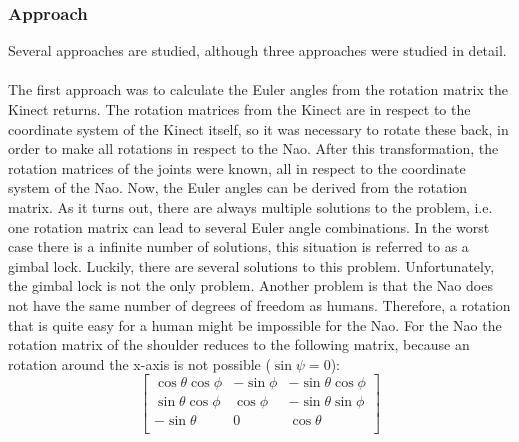 \documentclass[letterpaper, 10pt, conference]{ieeeconf}
\begin{document}
\subsubsection{Approach}
Several approaches are studied, although three approaches were studied in detail. 
\\
\\
The first approach was to calculate the Euler angles from the rotation matrix the Kinect returns. 
The rotation matrices from the Kinect are in respect to the coordinate system of the Kinect itself, so it was necessary to rotate these back, in order to make all rotations in respect to the Nao. 
After this transformation, the rotation matrices of the joints were known, all in respect to the coordinate system of the Nao. 
Now, the Euler angles can be derived from the rotation matrix.  
As it turns out, there are always multiple solutions to the problem, i.e. one rotation matrix can lead to several Euler angle combinations. 
In the worst case there is a infinite number of solutions, this situation is referred to as a gimbal lock\cite{Shoemake1985}. Luckily, there are several solutions to this problem\cite{euler}. 
Unfortunately, the gimbal lock is not the only problem.
Another problem is that the Nao does not have the same number of degrees of freedom as humans. Therefore, a rotation that is quite easy for a human might be impossible for the Nao.
For the Nao the rotation matrix of the shoulder reduces to the following matrix, because an rotation around the x-axis is not possible ($\sin \psi = 0$):
\begin{equation}
\label{eq:rotation_matrix}
\begin{bmatrix}
\cos \theta \cos \phi & -\sin \phi & -\sin \theta \cos \phi\\
\sin \theta \cos \phi & \cos \phi & -\sin \theta \sin \phi\\
-\sin \theta & 0 & \cos \theta\\
\end{bmatrix}
\end{equation}
\end{document}
